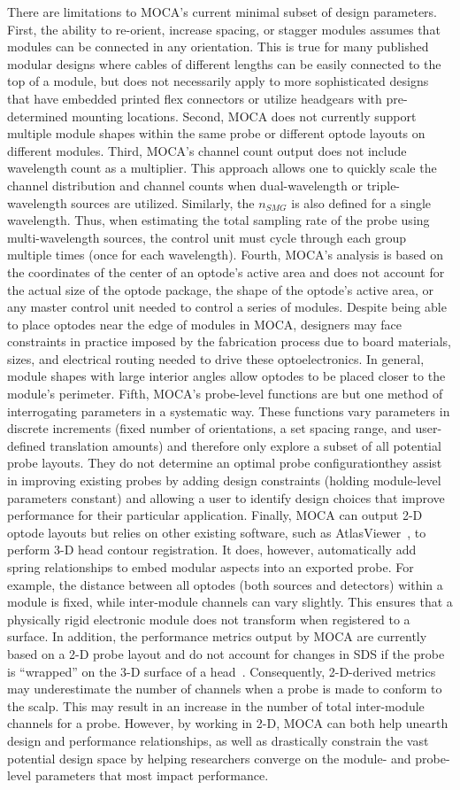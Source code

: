 There are limitations to MOCA's current minimal subset of design parameters. First, the ability to re-orient, increase spacing, or stagger modules assumes that modules can be connected in any orientation. This is true for many published modular designs where cables of different lengths can be easily connected to the top of a module, but does not necessarily apply to more sophisticated designs that have embedded printed flex connectors or utilize headgears with pre-determined mounting locations. Second, MOCA does not currently support multiple module shapes within the same probe or different optode layouts on different modules. Third, MOCA's channel count output does not include wavelength count as a multiplier. This approach allows one to quickly scale the channel distribution and channel counts when dual-wavelength or triple-wavelength sources are utilized. Similarly, the $n_{SMG}$ is also defined for a single wavelength. Thus, when estimating the total sampling rate of the probe using multi-wavelength sources, the control unit must cycle through each group multiple times (once for each wavelength). Fourth, MOCA's analysis is based on the coordinates of the center of an optode's active area and does not account for the actual size of the optode package, the shape of the optode's active area, or any master control unit needed to control a series of modules. Despite being able to place optodes near the edge of modules in MOCA, designers may face constraints in practice imposed by the fabrication process due to board materials, sizes, and electrical routing needed to drive these optoelectronics. In general, module shapes with large interior angles allow optodes to be placed closer to the module's perimeter. Fifth, MOCA's probe-level functions are but one method of interrogating parameters in a systematic way. These functions vary parameters in discrete increments (fixed number of orientations, a set spacing range, and user-defined translation amounts) and therefore only explore a subset of all potential probe layouts. They do not determine an optimal probe configuration\textemdash they assist in improving existing probes by adding design constraints (holding module-level parameters constant) and allowing a user to identify design choices that improve performance for their particular application.  Finally, MOCA can output 2-D optode layouts but relies on other existing software, such as AtlasViewer~\cite{Aasted2015}, to perform 3-D head contour registration. It does, however, automatically add spring relationships to embed modular aspects into an exported probe. For example, the distance between all optodes (both sources and detectors) within a module is fixed, while inter-module channels can vary slightly. This ensures that a physically rigid electronic module does not transform when registered to a surface. In addition, the performance metrics output by MOCA are currently based on a 2-D probe layout and do not account for changes in SDS if the probe is ``wrapped'' on the 3-D surface of a head~\cite{Zhao2021}. Consequently, 2-D-derived metrics may underestimate the number of channels when a probe is made to conform to the scalp. This may result in an increase in the number of total inter-module channels for a probe. However, by working in 2-D, MOCA can both help unearth design and performance relationships, as well as drastically constrain the vast potential design space by helping researchers converge on the module- and probe-level parameters that most impact performance.
